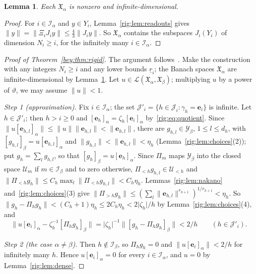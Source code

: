 \documentclass[11pt]{amsart}
\newtheorem{lemma}[theorem]{Lemma}
\theoremstyle{definition}
\theoremstyle{remark}
\numberwithin{equation}{section}
\newcommand{\cL}{\mathcal L}
\newcommand{\abs}[1]{\lvert #1\rvert}
\newcommand{\norm}[1]{\lVert #1\rVert}
\theoremstyle{plain}
\theoremstyle{definition}
\theoremstyle{plain}
\newcommand{\fX}{\mathfrak X}
\begin{document}
\begin{lemma}\label{rig:lem:nonzero}
Each $\fX_\alpha$ is nonzero and infinite-dimensional.
\end{lemma}

\begin{proof}
For $i\in\mathcal I_\alpha$ and $y\in Y_i$, Lemma~\ref{rig:lem:readouts} gives
$\norm y=\norm{\Xi_iJ_iy}\le\frac43\norm{J_iy}$. So $\fX_\alpha$ contains the subspaces $J_i(Y_i)$ of dimension
$N_i\ge i$, for the infinitely many $i\in\mathcal I_\alpha$.
\end{proof}

\begin{proof}[Proof of Theorem~\textup{\ref{bey:thm:rigid}}]
The argument follows~\cite[Theorem~3.6]{KR}. Make the construction with any integers $N_i\ge i$ and any lower bounds
$\underline r_i$; the Banach spaces $\fX_\alpha$ are infinite-dimensional by Lemma~\ref{rig:lem:nonzero}. Let
$u\in\cL(\fX_\alpha,\fX_\beta)$; multiplying $u$ by a power of $\vartheta$, we may assume $\norm u<1$.

\emph{Step 1 (approximation).} Fix $i\in\mathcal I_\alpha$; the set $\mathcal J'_i=\{h\in\mathcal J_i:\gamma_h=\mathbf e_i\}$
is infinite. Let $h\in\mathcal J'_i$; then $h>i\ge0$ and $[\mathbf e_h]_\alpha=\zeta_h[\mathbf e_i]_\alpha$
by~\eqref{rig:eq:quotient}. Since $\norm{u[\mathbf e_{h,l}]_\alpha}\le\norm u\norm{\mathbf e_{h,l}}<\norm{\mathbf e_{h,l}}$, there are
$g_{h,l}\in\mathcal Y_\beta$, $1\le l\le d_h$, with $[g_{h,l}]_\beta=u[\mathbf e_{h,l}]_\alpha$ and
$\norm{g_{h,l}}<\norm{\mathbf e_{h,l}}<\eta_h$ (Lemma~\ref{rig:lem:choices}(2)); put $g_h=\sum_lg_{h,l}$, so that
$[g_h]_\beta=u[\mathbf e_h]_\alpha$. Since $\Pi_m$ maps $\mathcal Y_\beta$ into the closed space $\mathcal U_m$ if
$m\in\mathcal I_\beta$ and to zero otherwise, $\Pi_{<h}g_{h,l}\in\mathcal U_{<h}$ and
$\norm{\Pi_{<h}g_h}\le C_h\max_l\norm{\Pi_{<h}g_{h,l}}<C_h\eta_h$. Lemmas~\ref{rig:lem:nakano}
and~\ref{rig:lem:choices}(3) give $\norm{\Pi_{>h}g_h}\le(\sum_l\norm{\mathbf e_{h,l}}^{r_{h+1}})^{1/r_{h+1}}<\eta_h$. So
$\norm{g_h-\Pi_hg_h}<(C_h+1)\eta_h\le2C_h\eta_h<2\abs{\zeta_h}/h$ by Lemma~\ref{rig:lem:choices}(4), and
\begin{equation}\label{rig:eq:approx}
 \bigl\lVert u[\mathbf e_i]_\alpha-\zeta_h^{-1}[\Pi_hg_h]_\beta\bigr\rVert
 =\abs{\zeta_h}^{-1}\norm{[g_h-\Pi_hg_h]_\beta}<2/h\qquad(h\in\mathcal J'_i).
\end{equation}

\emph{Step 2 (the case $\alpha\ne\beta$).} Then $h\notin\mathcal I_\beta$, so $\Pi_hg_h=0$ and
$\norm{u[\mathbf e_i]_\alpha}<2/h$ for infinitely many $h$. Hence $u[\mathbf e_i]_\alpha=0$ for every
$i\in\mathcal I_\alpha$, and $u=0$ by Lemma~\ref{rig:lem:dense}.


\end{proof}
\end{document}
